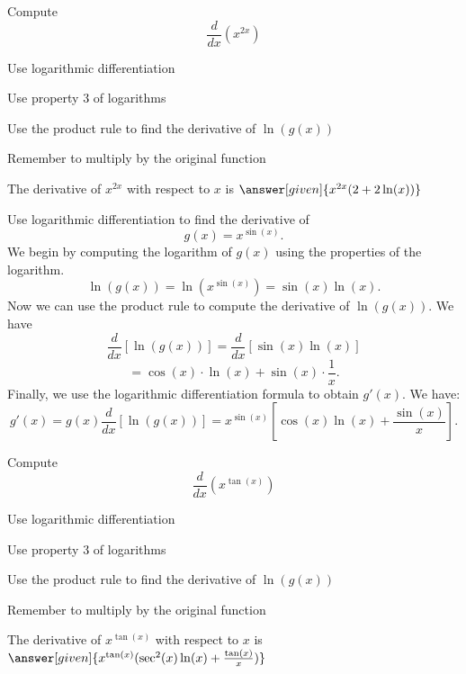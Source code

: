 \documentclass{ximera}
\begin{document}
\begin{problem} %
  Compute
  \[
  \frac{d}{dx} \left(x^{2x}\right)
  \]
  
    \begin{hint}
      Use logarithmic differentiation
    \end{hint}
    \begin{hint}
      Use property 3 of logarithms
    \end{hint}
    \begin{hint}
		  Use the product rule to find the derivative of $\ln(g(x))$
		\end{hint}
		\begin{hint}
		  Remember to multiply by the original function
		\end{hint}
    
		The derivative of $x^{2x}$ with respect to $x$ is
		 $\answer[given]{x^{2x} (2+2\ln(x))}$
		
\end{problem}

\begin{example}
Use logarithmic differentiation to find the derivative of 
\[
g(x) = x^{\sin(x)}.
\]
We begin by computing the logarithm of $g(x)$ using the properties of the logarithm.
\[
\ln(g(x)) = \ln\left(x^{\sin(x)}\right) = \sin(x)\ln(x).
\]
Now we can use the product rule to compute the derivative of $\ln(g(x))$.
We have
\[
\frac{d}{dx} \left[\ln(g(x))\right] = \frac{d}{dx} \left[\sin(x)\ln(x)\right]
\]
\[
= \cos(x)\cdot \ln(x) + \sin(x) \cdot \frac{1}{x}.
\]
Finally, we use the logarithmic differentiation formula to obtain $g'(x)$.
We have:
\[
g'(x) = g(x) \frac{d}{dx} \left[\ln(g(x))\right] = x^{\sin(x)} \left[\cos(x)\ln(x) + \frac{\sin(x)}{x}\right].
\]

\end{example}


\begin{problem} %
  Compute
  \[
  \frac{d}{dx} \left(x^{\tan(x)}\right)
  \]
  
    \begin{hint}
      Use logarithmic differentiation
    \end{hint}
    \begin{hint}
      Use property 3 of logarithms
    \end{hint}
    \begin{hint}
		  Use the product rule to find the derivative of $\ln(g(x))$
		\end{hint}
		\begin{hint}
		  Remember to multiply by the original function
		\end{hint}
    
		The derivative of $x^{\tan(x)}$ with respect to $x$ is
		 $\answer[given]{x^{\tan(x)} (\sec^2(x)\ln(x) + \frac{\tan(x)}{x})}$
		
\end{problem}
\end{document}
